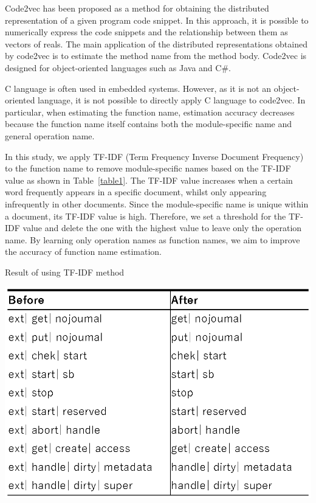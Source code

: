 \documentclass[JIP]{apris}
\begin{document}
Code2vec\cite{alon2019code2vec} has been proposed as a method for obtaining the distributed representation of a given program code snippet. In this approach, it is possible to numerically express the code snippets and the relationship between them as vectors of reals. The main application of the distributed representations obtained by code2vec is to estimate the method name from the method body. Code2vec is designed for object-oriented languages such as Java and C\#. 

C language is often used in embedded systems. However, as it is not an object-oriented language, it is not possible to directly apply C language to code2vec. In particular, when estimating the function name, estimation accuracy decreases because the function name itself contains both the module-specific name and general operation name.

In this study, we apply TF-IDF (Term Frequency Inverse Document Frequency)\cite{zhang2011comparative} to the function name to remove module-specific names based on the TF-IDF value as shown in Table~\ref{table1}. The TF-IDF value increases when a certain word frequently appears in a specific document, whilst only appearing infrequently in other documents. Since the module-specific name is unique within a document, its TF-IDF value is high. Therefore, we set a threshold for the TF-IDF value and delete the one with the highest value to leave only the operation name. By learning only operation names as function names, we aim to improve the accuracy of function name estimation. 

\begin{table}[t]
 \centering
 \caption{Result of using TF-IDF method}
 \includegraphics[width=1.0\hsize]{image/TF-IDF.eps} 
 \label{table1} 
\end{table}
\end{document}
